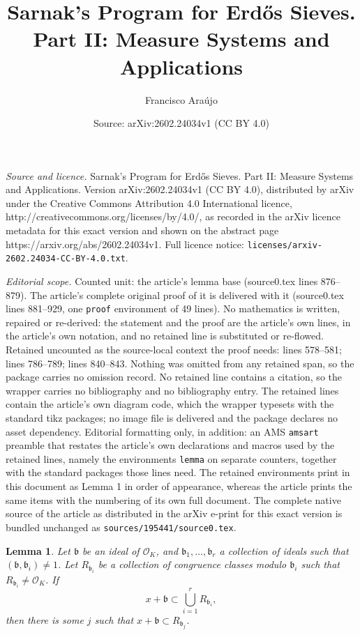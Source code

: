 \documentclass[10pt,a4paper]{amsart}
\title{Sarnak's Program for Erd\H{o}s Sieves. Part II: Measure Systems and Applications}
\author{Francisco Ara\'ujo}
\date{Source: arXiv:2602.24034v1 (CC BY 4.0)}
\newtheorem{lemma}{Lemma}
\newcommand{\co}{\mathcal{O}}
\newcommand{\gb}{\mathfrak{b}}
\begin{document}
\maketitle

\noindent\emph{Source and licence.} Sarnak's Program for Erd\H{o}s Sieves. Part II: Measure Systems and Applications. Version arXiv:2602.24034v1 (CC BY 4.0), distributed by arXiv under the Creative Commons Attribution 4.0 International licence, http://creativecommons.org/licenses/by/4.0/, as recorded in the arXiv licence metadata for this exact version and shown on the abstract page https://arxiv.org/abs/2602.24034v1. Full licence notice: \texttt{licenses/arxiv-2602.24034-CC-BY-4.0.txt}.\par\smallskip

\noindent\textit{Editorial scope.} Counted unit: the article's lemma base (source0.tex lines 876--879). The article's complete original proof of it is delivered with it (source0.tex lines 881--929, one \texttt{proof} environment of 49 lines). No mathematics is written, repaired or re-derived: the statement and the proof are the article's own lines, in the article's own notation, and no retained line is substituted or re-flowed.  Retained uncounted as the source-local context the proof needs: lines 578--581; lines 786--789; lines 840--843.  Nothing was omitted from any retained span, so the package carries no omission record.  No retained line contains a citation, so the wrapper carries no bibliography and no bibliography entry.  The retained lines contain the article's own diagram code, which the wrapper typesets with the standard tikz packages; no image file is delivered and the package declares no asset dependency.  Editorial formatting only, in addition: an AMS \texttt{amsart} preamble that restates the article's own declarations and macros used by the retained lines, namely the environments \texttt{lemma} on separate counters, together with the standard packages those lines need.  The retained environments print in this document as Lemma 1 in order of appearance, whereas the article prints the same items with the numbering of its own full document.  The complete native source of the article as distributed in the arXiv e-print for this exact version is bundled unchanged as \texttt{sources/195441/source0.tex}.
		\begin{lemma}
			\label{lm: if x gb in union must belong to one}
			Let $\gb$ be an ideal of $\co_K$, and $\gb_1,\dots,\gb_r$ a collection of ideals such that $(\gb,\gb_i) \neq 1$. Let $R_{\gb_i}$ be a collection of congruence classes modulo $\gb_i$ such that $R_{\gb_i} \neq \co_K$. If $$x+\gb \subset \bigcup_{i=1}^r R_{\gb_i},$$ then there is some $j$ such that $x+\gb \subset R_{\gb_j}$.
		\end{lemma}
\end{document}
